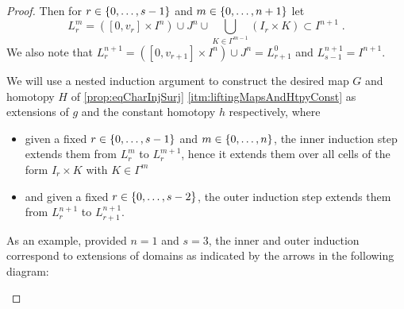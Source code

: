 \begin{prop}
\begin{proof}
        Then for $r\in\left\lbrace0,\ldots,s-1\right\rbrace$ and $m\in\left\lbrace0,\ldots,n+1\right\rbrace$ let
        \begin{equation*}
            L_r^m=\left([0,v_r]\times I^n\right)\cup J^n\cup\bigcup\limits_{K\in\Gamma^{m-1}}\left(I_r\times K\right)\subset I^{n+1}\;.
        \end{equation*}
        We also note that $L_r^{n+1}=\left([0,v_{r+1}]\times I^n\right)\cup J^n=L_{r+1}^0$ and $L_{s-1}^{n+1}=I^{n+1}$.

        We will use a nested induction argument to construct the desired map $G$ and homotopy $H$ of \cref{prop:eqCharInjSurj} \ref{itm:liftingMapsAndHtpyConst} as extensions of $g$ and the constant homotopy $h$ respectively, where 
        \begin{itemize}
            \item given a fixed $r\in\left\lbrace0,\ldots,s-1\right\rbrace$ and $m\in\left\lbrace0,\ldots,n\right\rbrace$, the inner induction step extends them from $L_r^m$ to $L_r^{m+1}$, hence it extends them over all cells of the form $I_r\times K$ with $K\in\Gamma^m$
            \item and given a fixed $r\in\left\lbrace0,\ldots,s-2\right\rbrace$, the outer induction step extends them from $L_r^{n+1}$ to $L_{r+1}^{n+1}$.
        \end{itemize}
        As an example, provided $n=1$ and $s=3$, the inner and outer induction correspond to extensions of domains as indicated by the arrows in the following diagram:
        \begin{center}
\end{center}
\end{proof}
\end{prop}
